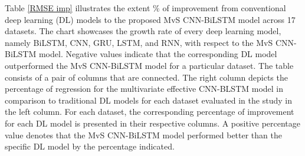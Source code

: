\documentclass[a4paper,fleqn]{cas-sc}
\begin{document}
    Table \ref{RMSE imp} illustrates the extent $\%$ of improvement from conventional deep learning (DL) models to the proposed MvS CNN-BiLSTM model across 17 datasets. The chart showcases the growth rate of every deep learning model, namely BiLSTM, CNN, GRU, LSTM, and RNN, with respect to the MvS CNN-BiLSTM model. Negative values indicate that the corresponding DL model outperformed the MvS CNN-BiLSTM model for a particular dataset. The table consists of a pair of columns that are connected. The right column depicts the percentage of regression for the multivariate effective CNN-BLSTM model in comparison to traditional DL models for each dataset evaluated in the study in the left column. For each dataset, the corresponding percentage of improvement for each DL model is presented in their respective columns. A positive percentage value denotes that the MvS CNN-BiLSTM model performed better than the specific DL model by the percentage indicated.

\end{document}
